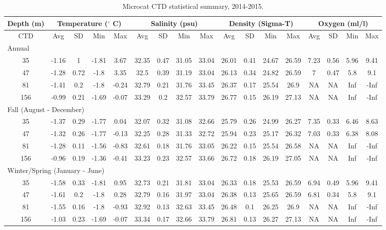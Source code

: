 \documentclass[12pt]{dforeport}
\begin{document}
\begin{landscape}
\begin{table}[ht] 
\centering
\caption[Microcat CTD statistical summary, 2014-2015]{Microcat CTD statistical summary, 2014-2015.} 
\label{t:ss_2014_2015}
\begin{tabular}{c | c c c c | c c c c | c c c c | c c c c}
\toprule 
\multicolumn{1}{c}{\textbf{Depth (m)}} & \multicolumn{4}{c}{\textbf{Temperature ($^\circ$ C)}} & \multicolumn{4}{c}{\textbf{Salinity (psu)}} & \multicolumn{4}{c}{\textbf{Density (Sigma-T)}} & \multicolumn{4}{c}{\textbf{Oxygen (ml/l)}} \\\hline
\midrule
CTD & Avg & SD & Min & Max & Avg & SD & Min & Max & Avg & SD & Min & Max & Avg & SD & Min & Max \\  
\midrule 
\multicolumn{17}{l}{Annual} \\
\midrule
35 & -1.16 & 1 & -1.81 & 3.67 & 32.35 & 0.47 & 31.05 & 33.04 & 26.01 & 0.41 & 24.67 & 26.59 & 7.23 & 0.56 & 5.96 & 9.41 \\
47 & -1.28 & 0.72 & -1.8 & 3.35 & 32.5 & 0.39 & 31.19 & 33.04 & 26.13 & 0.34 & 24.82 & 26.59 & 7 & 0.47 & 5.8 & 9.1 \\
81 & -1.41 & 0.2 & -1.8 & -0.24 & 32.79 & 0.21 & 31.76 & 33.45 & 26.37 & 0.17 & 25.54 & 26.9 & NA & NA & Inf & -Inf \\
156 & -0.99 & 0.21 & -1.69 & -0.07 & 33.29 & 0.2 & 32.57 & 33.79 & 26.77 & 0.15 & 26.19 & 27.13 & NA & NA & Inf & -Inf \\
\midrule 
\multicolumn{17}{l}{Fall (August - December)} \\
\midrule
35 & -1.37 & 0.29 & -1.77 & 0.04 & 32.07 & 0.32 & 31.08 & 32.66 & 25.79 & 0.26 & 24.99 & 26.27 & 7.35 & 0.33 & 6.46 & 8.63 \\
47 & -1.32 & 0.26 & -1.77 & -0.13 & 32.25 & 0.28 & 31.33 & 32.72 & 25.94 & 0.23 & 25.17 & 26.32 & 7.03 & 0.33 & 6.38 & 8.08 \\
81 & -1.28 & 0.11 & -1.56 & -0.83 & 32.61 & 0.18 & 31.76 & 33.05 & 26.22 & 0.15 & 25.54 & 26.58 & NA & NA & Inf & -Inf \\
156 & -0.96 & 0.19 & -1.36 & -0.41 & 33.23 & 0.23 & 32.57 & 33.66 & 26.72 & 0.18 & 26.19 & 27.05 & NA & NA & Inf & -Inf \\
\midrule  
\multicolumn{17}{l}{Winter/Spring (January - June)} \\
\midrule
35 & -1.58 & 0.33 & -1.81 & 0.95 & 32.73 & 0.21 & 31.81 & 33.04 & 26.33 & 0.18 & 25.53 & 26.59 & 6.94 & 0.49 & 5.96 & 9.41 \\ 
47 & -1.61 & 0.2 & -1.8 & 0.28 & 32.79 & 0.16 & 31.97 & 33.04 & 26.38 & 0.13 & 25.65 & 26.59 & 6.81 & 0.34 & 5.8 & 9.1 \\
81 & -1.55 & 0.16 & -1.8 & -0.93 & 32.92 & 0.13 & 32.63 & 33.45 & 26.48 & 0.1 & 26.25 & 26.9 & NA & NA & Inf & -Inf \\
156 & -1.03 & 0.23 & -1.69 & -0.07 & 33.34 & 0.17 & 32.66 & 33.79 & 26.81 & 0.13 & 26.27 & 27.13 & NA & NA & Inf & -Inf \\
\bottomrule
\end{tabular}
\end{table}



\end{landscape}
\end{document}
